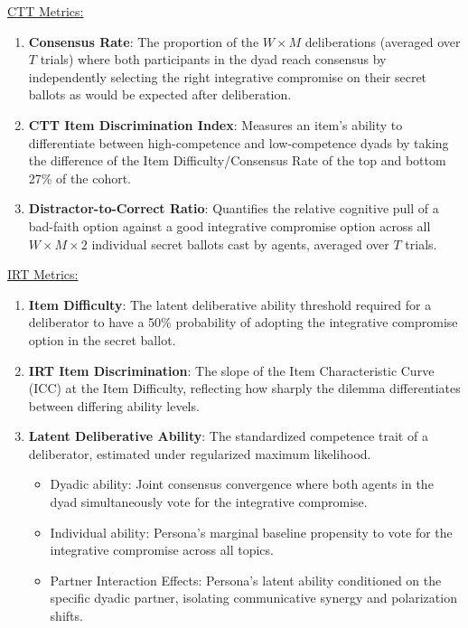 \documentclass[titlepage]{article}
\begin{document}
\underline{CTT Metrics:}
\begin{enumerate}
    \item \textbf{Consensus Rate}: The proportion of the $W \times M$ deliberations (averaged over $T$ trials) where both participants in the dyad reach consensus by independently selecting the right integrative compromise on their secret ballots as would be expected after deliberation.
    \item \textbf{CTT Item Discrimination Index}: Measures an item's ability to differentiate between high-competence and low-competence dyads by taking the difference of the Item Difficulty/Consensus Rate of the top and bottom 27\% of the cohort.
    \item \textbf{Distractor-to-Correct Ratio}: Quantifies the relative cognitive pull of a bad-faith option against a good integrative compromise option across all $W \times M \times 2$ individual secret ballots cast by agents, averaged over $T$ trials.
\end{enumerate}

\underline{IRT Metrics:}
\begin{enumerate}
    \item \textbf{Item Difficulty}: The latent deliberative ability threshold required for a deliberator to have a 50\% probability of adopting the integrative compromise option in the secret ballot.
    \item \textbf{IRT Item Discrimination}: The slope of the Item Characteristic Curve (ICC) at the Item Difficulty, reflecting how sharply the dilemma differentiates between differing ability levels.
    \item \textbf{Latent Deliberative Ability}: The standardized competence trait of a deliberator, estimated under regularized maximum likelihood. 
    \begin{itemize}
        \item Dyadic ability: Joint consensus convergence where both agents in the dyad simultaneously vote for the integrative compromise.
        \item Individual ability: Persona's marginal baseline propensity to vote for the integrative compromise across all topics.
        \item Partner Interaction Effects: Persona's latent ability conditioned on the specific dyadic partner, isolating communicative synergy and polarization shifts.
    \end{itemize}
\end{enumerate}
\end{document}
